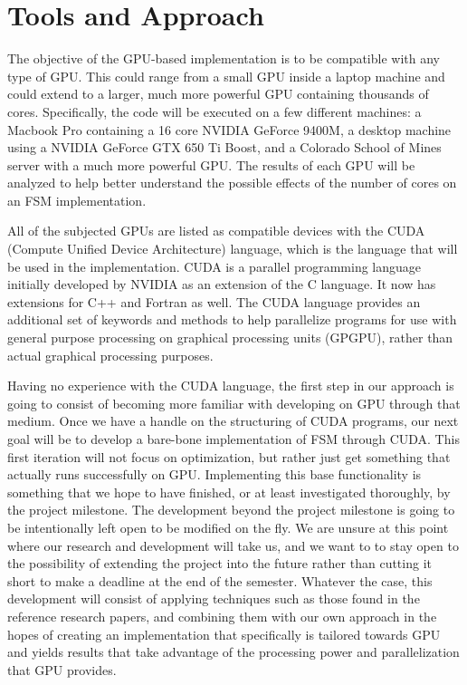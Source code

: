 \documentclass{sigplanconf}
\begin{document}
\section{Tools and Approach}
The objective of the GPU-based implementation is to be compatible with any type of GPU. This could range from a small GPU inside a laptop machine and could extend to a larger, much more powerful GPU containing thousands of cores. Specifically, the code will be executed on a few different machines: a Macbook Pro containing a 16 core NVIDIA GeForce 9400M, a desktop machine using a NVIDIA GeForce GTX 650 Ti Boost, and a Colorado School of Mines server with a much more powerful GPU. The results of each GPU will be analyzed to help better understand the possible effects of the number of cores on an FSM implementation.

All of the subjected GPUs are listed as compatible devices with the CUDA (Compute Unified Device Architecture) language, which is the language that will be used in the implementation. CUDA is a parallel programming language initially developed by NVIDIA as an extension of the C language. It now has extensions for C++ and Fortran as well. The CUDA language provides an additional set of keywords and methods to help parallelize programs for use with general purpose processing on graphical processing units (GPGPU), rather than actual graphical processing purposes.

Having no experience with the CUDA language, the first step in our approach is going to consist of becoming more familiar with developing on GPU through that medium. Once we have a handle on the structuring of CUDA programs, our next goal will be to develop a bare-bone implementation of FSM through CUDA. This first iteration will not focus on optimization, but rather just get something that actually runs successfully on GPU. Implementing this base functionality is something that we hope to have finished, or at least investigated thoroughly, by the project milestone. The development beyond the project milestone is going to be intentionally left open to be modified on the fly. We are unsure at this point where our research and development will take us, and we want to to stay open to the possibility of extending the project into the future rather than cutting it short to make a deadline at the end of the semester. Whatever the case, this development will consist of applying techniques such as those found in the reference research papers, and combining them with our own approach in the hopes of creating an implementation that specifically is tailored towards GPU and yields results that take advantage of the processing power and parallelization that GPU provides.
\end{document}

